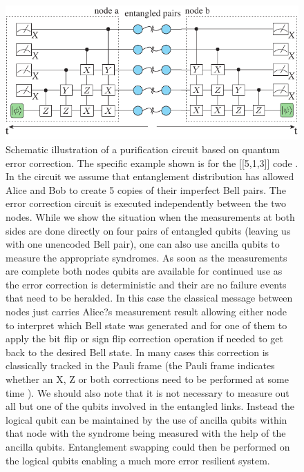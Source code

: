 \documentclass[twocolumn, aps, rmp, amsmath, amssymb, nofootinbib, superscriptaddress, longbibliography, floatfix, table-of-contents, eqsecnum]{revtex4-1}
\newcommand{\comment}[1]{{\color{blue}{\textbf{#1}}}}
\begin{document}
\begin{figure}[!htb]
\includegraphics[width=\textwidth]{repeaters_7}
\caption{\comment{Redo fig} Schematic illustration of a purification circuit based on quantum error correction. The specific example shown is for the [[5,1,3]] code \cite{Bennettr1996a,Knill97}. In the circuit we assume that entanglement distribution has allowed Alice and Bob to create 5 copies of their imperfect Bell pairs. The error correction circuit is  executed independently between the two nodes. While we show the situation when the measurements at both sides are done directly on four pairs of entangled qubits (leaving us with one unencoded Bell pair), one can also use ancilla qubits to measure the appropriate syndromes.  As soon as the measurements are complete both nodes qubits are available for continued use as the error correction is deterministic and their are no failure events that need to be heralded. In this case the classical message between nodes just carries Alice?s measurement result allowing either node to interpret which Bell state was generated and for one of them to apply the bit flip or sign flip correction operation if needed to get back to the desired Bell state. In many cases this correction is classically tracked in the Pauli frame (the Pauli frame indicates whether an X, Z or both corrections need to be performed at some time \cite{jiang09,munro10}). We should also note that it is not necessary to measure out all but one of the qubits involved in the entangled links. Instead the logical qubit can be maintained by the use of ancilla qubits within that node with the syndrome being measured with the help of the ancilla qubits. Entanglement swapping could then be performed on the logical qubits enabling a much more error resilient system.
}
\label{fig:repeaters_7}
\end{figure} 
\end{document}
